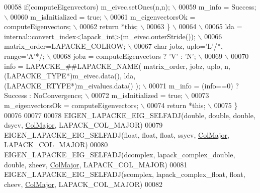 \begin{DoxyCode}
00058 \textcolor{preprocessor}{    if(computeEigenvectors) m\_eivec.setOnes(n,n); \(\backslash\)}
00059 \textcolor{preprocessor}{    m\_info = Success; \(\backslash\)}
00060 \textcolor{preprocessor}{    m\_isInitialized = true; \(\backslash\)}
00061 \textcolor{preprocessor}{    m\_eigenvectorsOk = computeEigenvectors; \(\backslash\)}
00062 \textcolor{preprocessor}{    return *this; \(\backslash\)}
00063 \textcolor{preprocessor}{  \} \(\backslash\)}
00064 \textcolor{preprocessor}{\(\backslash\)}
00065 \textcolor{preprocessor}{  lda = internal::convert\_index<lapack\_int>(m\_eivec.outerStride()); \(\backslash\)}
00066 \textcolor{preprocessor}{  matrix\_order=LAPACKE\_COLROW; \(\backslash\)}
00067 \textcolor{preprocessor}{  char jobz, uplo='L'}\textcolor{comment}{/*, range='A'*/}\textcolor{preprocessor}{; \(\backslash\)}
00068 \textcolor{preprocessor}{  jobz = computeEigenvectors ? 'V' : 'N'; \(\backslash\)}
00069 \textcolor{preprocessor}{\(\backslash\)}
00070 \textcolor{preprocessor}{  info = LAPACKE\_##LAPACKE\_NAME( matrix\_order, jobz, uplo, n, (LAPACKE\_TYPE*)m\_eivec.data(), lda,
       (LAPACKE\_RTYPE*)m\_eivalues.data() ); \(\backslash\)}
00071 \textcolor{preprocessor}{  m\_info = (info==0) ? Success : NoConvergence; \(\backslash\)}
00072 \textcolor{preprocessor}{  m\_isInitialized = true; \(\backslash\)}
00073 \textcolor{preprocessor}{  m\_eigenvectorsOk = computeEigenvectors; \(\backslash\)}
00074 \textcolor{preprocessor}{  return *this; \(\backslash\)}
00075 \textcolor{preprocessor}{\}}
00076 
00077 
00078 EIGEN\_LAPACKE\_EIG\_SELFADJ(\textcolor{keywordtype}{double},   \textcolor{keywordtype}{double},                \textcolor{keywordtype}{double}, dsyev, 
      \hyperlink{group__enums_ggaacded1a18ae58b0f554751f6cdf9eb13a0cbd4bdd0abcfc0224c5fcb5e4f6669a}{ColMajor}, LAPACK\_COL\_MAJOR)
00079 EIGEN\_LAPACKE\_EIG\_SELFADJ(\textcolor{keywordtype}{float},    \textcolor{keywordtype}{float},                 \textcolor{keywordtype}{float},  ssyev, 
      \hyperlink{group__enums_ggaacded1a18ae58b0f554751f6cdf9eb13a0cbd4bdd0abcfc0224c5fcb5e4f6669a}{ColMajor}, LAPACK\_COL\_MAJOR)
00080 EIGEN\_LAPACKE\_EIG\_SELFADJ(dcomplex, lapack\_complex\_double, \textcolor{keywordtype}{double}, zheev, 
      \hyperlink{group__enums_ggaacded1a18ae58b0f554751f6cdf9eb13a0cbd4bdd0abcfc0224c5fcb5e4f6669a}{ColMajor}, LAPACK\_COL\_MAJOR)
00081 EIGEN\_LAPACKE\_EIG\_SELFADJ(scomplex, lapack\_complex\_float,  \textcolor{keywordtype}{float},  cheev, 
      \hyperlink{group__enums_ggaacded1a18ae58b0f554751f6cdf9eb13a0cbd4bdd0abcfc0224c5fcb5e4f6669a}{ColMajor}, LAPACK\_COL\_MAJOR)
00082 

\end{DoxyCode}
